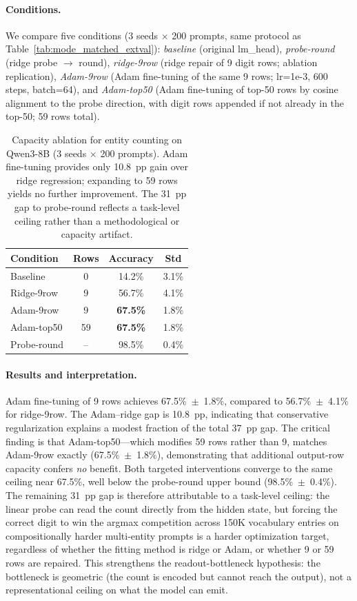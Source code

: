 \documentclass{article}
\begin{document}
\paragraph{Conditions.}
We compare five conditions (3 seeds $\times$ 200 prompts, same protocol as Table~\ref{tab:mode_matched_extval}):
\textit{baseline} (original lm\_head),
\textit{probe-round} (ridge probe $\to$ round),
\textit{ridge-9row} (ridge repair of 9 digit rows; ablation replication),
\textit{Adam-9row} (Adam fine-tuning of the same 9 rows; lr=1e-3, 600 steps, batch=64),
and \textit{Adam-top50} (Adam fine-tuning of top-50 rows by cosine alignment to the probe direction,
with digit rows appended if not already in the top-50; 59 rows total).

\begin{table}[h]
\centering
\caption{Capacity ablation for entity counting on Qwen3-8B (3 seeds $\times$ 200 prompts).
Adam fine-tuning provides only 10.8~pp gain over ridge regression; expanding to
59 rows yields no further improvement. The 31~pp gap to probe-round reflects a
task-level ceiling rather than a methodological or capacity artifact.}
\label{tab:capacity_ablation}
\small
\begin{tabular}{lccc}
\toprule
Condition & Rows & Accuracy & Std \\
\midrule
Baseline & 0 & 14.2\% & 3.1\% \\
Ridge-9row & 9 & 56.7\% & 4.1\% \\
Adam-9row & 9 & \textbf{67.5\%} & 1.8\% \\
Adam-top50 & 59 & \textbf{67.5\%} & 1.8\% \\
Probe-round & -- & 98.5\% & 0.4\% \\
\bottomrule
\end{tabular}
\end{table}

\paragraph{Results and interpretation.}
Adam fine-tuning of 9 rows achieves 67.5\%~$\pm$~1.8\%, compared to 56.7\%~$\pm$~4.1\% for ridge-9row.
The Adam--ridge gap is 10.8~pp, indicating that conservative regularization
explains a modest fraction of the total 37~pp gap.
The critical finding is that Adam-top50---which modifies 59 rows rather than 9, matches
Adam-9row exactly (67.5\%~$\pm$~1.8\%), demonstrating that additional output-row capacity
confers \emph{no} benefit.
Both targeted interventions converge to the same ceiling near 67.5\%,
well below the probe-round upper bound (98.5\%~$\pm$~0.4\%).
The remaining 31~pp gap is therefore attributable to a task-level ceiling:
the linear probe can read the count directly from the hidden state, but
forcing the correct digit to win the argmax competition across 150K vocabulary entries
on compositionally harder multi-entity prompts is a harder optimization target,
regardless of whether the fitting method is ridge or Adam, or whether 9 or 59 rows are repaired.
This strengthens the readout-bottleneck hypothesis: the bottleneck is geometric (the count
is encoded but cannot reach the output), not a representational ceiling on what the model can emit.
\end{document}
